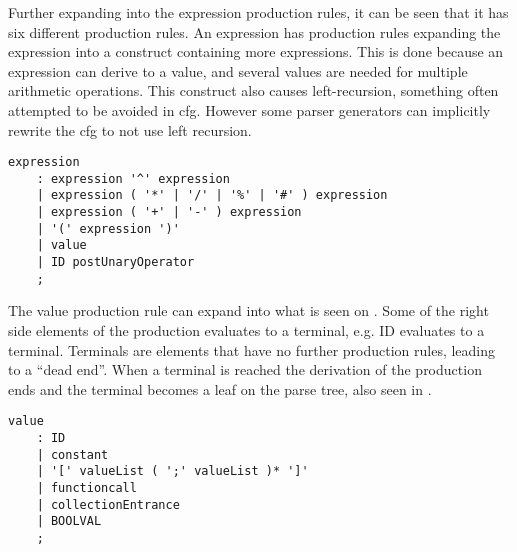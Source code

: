 Further expanding into the expression production rules, it can be seen that it has six different production rules. 
An expression has production rules expanding the expression into a construct containing more expressions.
This is done because an expression can derive to a value, and several values are needed for multiple arithmetic operations.
This construct also causes left-recursion, something often attempted to be avoided in \acrshort{cfg}.
However some parser generators can implicitly rewrite the \acrshort{cfg} to not use left recursion.
\begin{lstlisting}[caption={\acrshort{cfg} for Expressions in \gls{gamble}},frame=tlrb,label={lst:expression},numbers=none]
expression                                            
    : expression '^' expression                       
    | expression ( '*' | '/' | '%' | '#' ) expression 
    | expression ( '+' | '-' ) expression             
    | '(' expression ')'                              
    | value                                           
    | ID postUnaryOperator                            
    ; 
\end{lstlisting}
  
The value production rule can expand into what is seen on .
Some of the right side elements of the production evaluates to a terminal, e.g. ID evaluates to a terminal.
Terminals are elements that have no further production rules, leading to a ``dead end''.
When a terminal is reached the derivation of the production ends and the terminal becomes a leaf on the parse tree, also seen in .
\begin{lstlisting}[caption={\acrshort{cfg} for Values in \gls{gamble}},frame=tlrb,label={lst:value},numbers=none]
value                                      
    : ID                                   
    | constant                             
    | '[' valueList ( ';' valueList )* ']' 
    | functioncall                         
    | collectionEntrance                   
    | BOOLVAL                              
    ;                        
\end{lstlisting}
